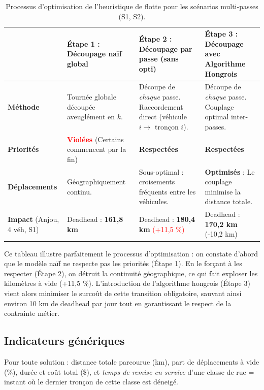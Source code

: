 \documentclass[11pt,a4paper]{article}
\begin{document}
\begin{table}[H]
\centering\footnotesize
\renewcommand{\arraystretch}{1.3}
\begin{tabular}{p{2.2cm}p{3.8cm}p{4.2cm}p{4.2cm}}
\toprule
& \textbf{Étape 1 : Découpage naïf global} & \textbf{Étape 2 : Découpage par passe (sans opti)} & \textbf{Étape 3 : Découpage avec Algorithme Hongrois}\\
\midrule
\textbf{Méthode} & Tournée globale découpée aveuglément en $k$. & Découpe de \emph{chaque} passe. Raccordement direct (véhicule $i \to$ tronçon $i$). & Découpe de \emph{chaque} passe. Couplage optimal inter-passes.\\
\textbf{Priorités} & \textcolor{red}{\textbf{Violées}} (Certains commencent par la fin) & \textcolor{green!60!black}{\textbf{Respectées}} & \textcolor{green!60!black}{\textbf{Respectées}}\\
\textbf{Déplacements} & Géographiquement continu. & Sous-optimal : croisements fréquents entre les véhicules. & \textbf{Optimisés} : Le couplage minimise la distance totale.\\
\textbf{Impact} (Anjou, 4 véh, S1) & Deadhead : \textbf{161,8 km} & Deadhead : \textbf{180,4 km} \textcolor{red}{(+11,5 \%)} & Deadhead : \textbf{170,2 km} \textcolor{green!60!black}{(-10,2 km)}\\
\bottomrule
\end{tabular}
\caption{Processus d'optimisation de l'heuristique de flotte pour les scénarios multi-passes (S1, S2).}
\label{tab:avant_apres}
\end{table}

Ce tableau illustre parfaitement le processus d'optimisation : on constate d'abord que le modèle naïf ne respecte pas les priorités (Étape 1). En le forçant à les respecter (Étape 2), on détruit la continuité géographique, ce qui fait exploser les kilomètres à vide (+11,5 \%). L'introduction de l'algorithme hongrois (Étape 3) vient alors minimiser le surcoût de cette transition obligatoire, sauvant ainsi environ 10 km de deadhead par jour tout en garantissant le respect de la contrainte métier.

\subsection{Indicateurs génériques}
Pour toute solution : distance totale parcourue (km), part de déplacements à vide
(\%), durée et coût total (\$), et \emph{temps de remise en service} d'une classe
de rue = instant où le dernier tronçon de cette classe est déneigé.
\end{document}
